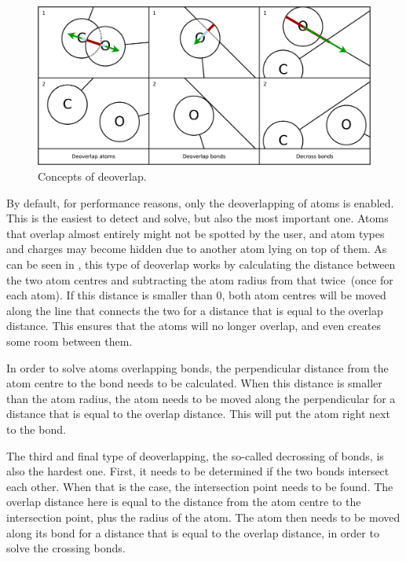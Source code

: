 \begin{figure}
\center
\includegraphics[width=\textwidth]{img/deoverlap.pdf}
\caption{Concepts of deoverlap.}
\end{figure}

By default, for performance reasons, only the deoverlapping of atoms is enabled. This is the easiest to detect and solve, but also the most important one. Atoms that overlap almost entirely might not be spotted by the user, and atom types and charges may become hidden due to another atom lying on top of them. As can be seen in , this type of deoverlap works by calculating the distance between the two atom centres and subtracting the atom radius from that twice~(once for each atom). If this distance is smaller than $0$, both atom centres will be moved along the line that connects the two for a distance that is equal to the overlap distance. This ensures that the atoms will no longer overlap, and even creates some room between them.

In order to solve atoms overlapping bonds, the perpendicular distance from the atom centre to the bond needs to be calculated. When this distance is smaller than the atom radius, the atom needs to be moved along the perpendicular for a distance that is equal to the overlap distance. This will put the atom right next to the bond.

The third and final type of deoverlapping, the so-called decrossing of bonds, is also the hardest one. First, it needs to be determined if the two bonds intersect each other. When that is the case, the intersection point needs to be found. The overlap distance here is equal to the distance from the atom centre to the intersection point, plus the radius of the atom. The atom then needs to be moved along its bond for a distance that is equal to the overlap distance, in order to solve the crossing bonds.


